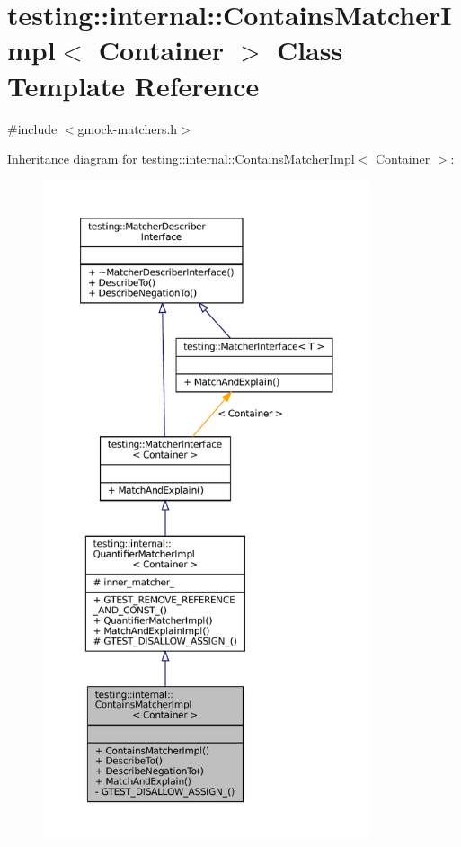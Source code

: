 \hypertarget{classtesting_1_1internal_1_1ContainsMatcherImpl}{}\section{testing\+:\+:internal\+:\+:Contains\+Matcher\+Impl$<$ Container $>$ Class Template Reference}
\label{classtesting_1_1internal_1_1ContainsMatcherImpl}


{\ttfamily \#include $<$gmock-\/matchers.\+h$>$}



Inheritance diagram for testing\+:\+:internal\+:\+:Contains\+Matcher\+Impl$<$ Container $>$\+:
\nopagebreak
\begin{figure}[H]
\begin{center}
\leavevmode
\includegraphics[height=550pt]{classtesting_1_1internal_1_1ContainsMatcherImpl__inherit__graph}
\end{center}
\end{figure}


